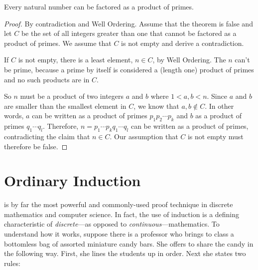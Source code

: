 \begin{theorem}\label{factor_into_primes}
Every natural number can be factored as a product of primes.
\end{theorem}
\begin{proof}
By contradiction and Well Ordering.  Assume that the theorem is false
and let $C$ be the set of all integers greater than one that cannot be
factored as a product of primes.  We assume that $C$ is not empty and derive a
contradiction.

If $C$ is not empty, there is a least element, $n \in C$, by Well
Ordering.  The $n$ can't be prime, because a prime by itself is considered
a (length one) product of primes and no such products are in $C$.

So $n$ must be a product of two integers $a$ and $b$ where $1<a,b<n$.
Since $a$ and $b$ are smaller than the smallest element in $C$, we know
that $a,b \notin C$.  In other words, $a$ can be written as a product of
primes $p_1p_2\cdots p_k$ and $b$ as a product of primes $q_1\cdots q_l$.
Therefore, $n=p_1\cdots p_k q_1 \cdots q_l$ can be written as a product of
primes, contradicting the claim that $n \in C$.  Our assumption that
$C$ is not empty must therefore be false.
\end{proof}

\begin{problems}
\practiceproblems
{}

\classproblems
{}

\homeworkproblems
{}
\end{problems}

\section{Ordinary Induction}

 is by far the most powerful and commonly-used proof technique in
discrete mathematics and computer science.  In fact, the use of induction
is a defining characteristic of \emph{discrete}---as opposed to
\emph{continuous}---mathematics.
%
To understand how it works, suppose there is a professor who brings
to class a bottomless bag of assorted miniature candy bars.  She offers to
share the candy in the following way.  First, she lines the students up in
order.  Next she states two rules:

